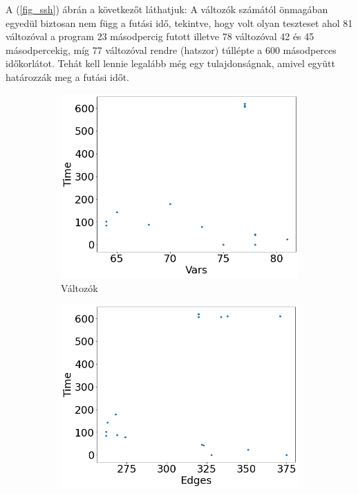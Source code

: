 A (\ref{fig_ssh}) ábrán a következőt láthatjuk: A változók számától önmagában egyedül biztosan nem függ a futási idő, tekintve, hogy volt olyan teszteset ahol 81 változóval a program 23 másodpercig futott illetve 78 változóval 42 és 45 másodpercekig, míg 77 változóval rendre (hatszor) túllépte a 600 másodperces időkorlátot. Tehát kell lennie legalább még egy tulajdonságnak, amivel együtt határozzák meg a futási időt.



\begin{figure}[ht] 
	\begin{subfigure}[b]{0.5\linewidth}
		\centering
		\includegraphics[width=0.95\linewidth]{figures/ssh/vars.png} 
		\caption{Változók} 
		\label{fig7:a} 
		\vspace{4ex}
	\end{subfigure}%
	\begin{subfigure}[b]{0.5\linewidth}
		\centering
		\includegraphics[width=0.95\linewidth]{figures/ssh/edges.png} 

\end{subfigure}
\end{figure}
